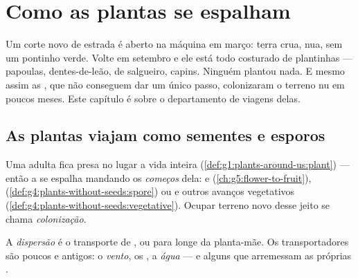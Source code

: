 \chapter{Como as plantas se espalham}\label{ch:g6:how-plants-spread}

Um corte novo de estrada é aberto na máquina em março: terra crua,
nua, sem um pontinho verde. Volte em setembro e ele está todo
costurado de plantinhas --- papoulas, dentes-de-leão,  de
salgueiro, capins. Ninguém plantou nada. E mesmo assim as , que
não conseguem dar um único passo, colonizaram o terreno nu em poucos
meses. Este capítulo é sobre o departamento de viagens delas.

\section{As plantas viajam como sementes e esporos}

\begin{proposition}\label{prop:g6:how-plants-spread:travel}
Uma  adulta fica presa no lugar a vida inteira
(\cref{def:g1:plants-around-us:plant}) --- então a  se espalha
mandando os \emph{começos} dela:  e 
(\cref{ch:g5:flower-to-fruit}), 
(\cref{def:g4:plants-without-seeds:spore}) ou  e outros
avanços vegetativos
(\cref{def:g4:plants-without-seeds:vegetative}). Ocupar terreno novo
desse jeito se chama \emph{colonização}.
\end{proposition}
\admitted

\begin{definition}[Dispersão]\label{def:g6:how-plants-spread:dispersal}
A \emph{dispersão} é o transporte de ,
 ou  para longe da planta-mãe. Os transportadores são
poucos e antigos: o \emph{vento}, os \emph{}, a \emph{água}
--- e alguns  que arremessam as próprias .
\end{definition}

